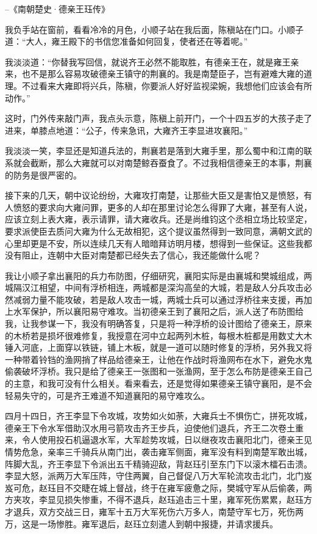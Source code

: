 --《南朝楚史·德亲王珏传》

我负手站在窗前，看看冷冷的月色，小顺子站在我后面，陈稹站在门口。小顺子道：“大人，雍王殿下的书信您准备如何回复，使者还在等着呢。”

我淡淡道：“你替我写回信，就说齐王必然不能取胜，有德亲王在，就是雍王亲来，也不是那么容易攻破德亲王镇守的荆襄的。我是南楚臣子，岂有避难大雍的道理。不过看来大雍即将兴兵，陈稹，你要派人好好监视梁婉，我想他们应该会有所动作。”

这时，门外传来敲门声，我点头示意，陈稹上前开门，一个十四五岁的大孩子走了进来，单膝点地道：“公子，传来急讯，大雍齐王李显进攻襄阳。”

我淡淡一笑，李显还是知道兵法的，荆襄若是落到大雍手里，那么蜀中和江南的联系就会截断，那么大雍就可以对南楚鲸吞蚕食了。不过我相信德亲王的本事，荆襄的防务是很严密的。

接下来的几天，朝中议论纷纷，大雍攻打南楚，让那些大臣又是害怕又是愤怒，有人愤怒的要求向大雍问罪，更多的人却在那里讨论怎么得罪了大雍，甚至有人说，应该立刻上表大雍，表示请罪，请大雍收兵。还是尚维钧这个丞相立场比较坚定，要求派使臣去质问大雍为什么无故相犯，这个提议虽然得到一致同意，满朝文武的心里却更是不安，所以连续几天有人暗暗拜访明月楼，想得到一些保证。这些我都没有阻止，连朝中大臣对南楚都已经失去了信心，我还能做什么呢？

我让小顺子拿出襄阳的兵力布防图，仔细研究，襄阳实际是由襄城和樊城组成，两城隔汉江相望，中间有浮桥相连，两城都是深沟高垒的大城，若是敌人分兵攻击必然减弱力量不能攻破，若是敌人攻击一城，两城士兵可以通过浮桥往来支援，再加上水军保护，所以襄阳易守难攻。当初德亲王到了襄阳之后，派人送了布防图给我，让我参谋一下，我没有明确答复，只是将一种浮桥的设计图给了德亲王，原来的木桥若是损坏很难修复，我授意在河中立起两列木桩，每根木桩都是用数丈大木锤入河底，上面穿以铁链，铺上木板，就是一道可以随时修复的浮桥，另外我又将一种带着铃铛的渔网捎了样品给德亲王，让他在作战时将渔网布在水下，避免水鬼偷袭破坏浮桥。我只是给了德亲王一张图和一张渔网，至于怎么布防是德亲王自己的主意，和我可没有什么相关。看来看去，还是觉得如果德亲王镇守襄阳，是不会轻易失守的，可是齐王难道不知道襄阳的易守难攻么。

四月十四日，齐王李显下令攻城，攻势如火如荼，大雍兵士不惧伤亡，拼死攻城，德亲王下令水军借助汉水用弓箭攻击齐王步兵，迫使他们退兵，齐王二次卷土重来，令人使用投石机逼退水军，大军趁势攻城，日以继夜攻击襄阳北门，德亲王见情势危急，亲率三千骑兵从南门出，袭击雍军侧面，雍军没有料到南楚军敢出城，阵脚大乱，齐王李显下令派出五千精骑迎敌，背赵珏引至东门下以滚木檑石击溃。李显大怒，派两万大军压阵，守住两翼，自己督促八万大军轮流攻击北门，北门岌岌可危，赵珏目不交睫在城上督战，终于在雍军疲惫之际，樊城守军从后偷袭，两方夹攻，李显见损失惨重，不得不退兵，赵珏追击三十里，雍军死伤累累，赵珏方才退兵，双方交战三日，雍军十五万大军死伤六万多人，南楚守军七万，死伤两万，这是一场惨胜。雍军退后，赵珏立刻遣人到朝中报捷，并请求援兵。

